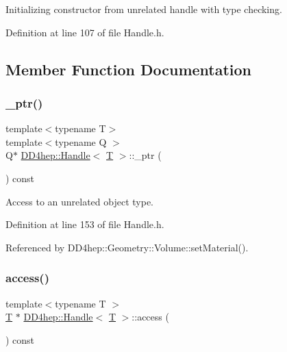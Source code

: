 Initializing constructor from unrelated handle with type checking. 



Definition at line 107 of file Handle.\+h.



\subsection{Member Function Documentation}
\hypertarget{class_d_d4hep_1_1_handle_ab89f950af32b485d28b14a10f2fd8173}{}\label{class_d_d4hep_1_1_handle_ab89f950af32b485d28b14a10f2fd8173} 
\subsubsection{\texorpdfstring{\+\_\+ptr()}{\_ptr()}}
{\footnotesize\ttfamily template$<$typename T$>$ \\
template$<$typename Q $>$ \\
Q$\ast$ \hyperlink{class_d_d4hep_1_1_handle}{D\+D4hep\+::\+Handle}$<$ \hyperlink{class_t}{T} $>$\+::\+\_\+ptr (\begin{DoxyParamCaption}{ }\end{DoxyParamCaption}) const\hspace{0.3cm}{\ttfamily [inline]}}



Access to an unrelated object type. 



Definition at line 153 of file Handle.\+h.



Referenced by D\+D4hep\+::\+Geometry\+::\+Volume\+::set\+Material().

\hypertarget{class_d_d4hep_1_1_handle_a39887c8fde6e11652715e07951fa7849}{}\label{class_d_d4hep_1_1_handle_a39887c8fde6e11652715e07951fa7849} 
\subsubsection{\texorpdfstring{access()}{access()}}
{\footnotesize\ttfamily template$<$typename T $>$ \\
\hyperlink{class_t}{T} $\ast$ \hyperlink{class_d_d4hep_1_1_handle}{D\+D4hep\+::\+Handle}$<$ \hyperlink{class_t}{T} $>$\+::access (\begin{DoxyParamCaption}{ }\end{DoxyParamCaption}) const}



